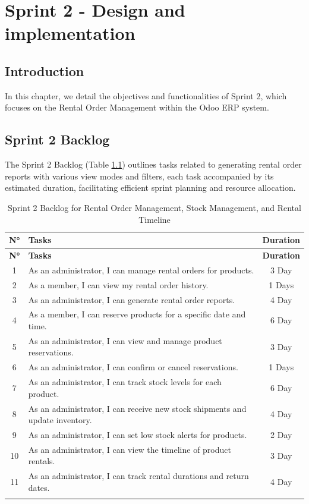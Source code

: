 \chapter{Sprint 2 - Design and implementation}

\section*{Introduction}
In this chapter, we detail the objectives and functionalities of Sprint 2, which focuses on the Rental Order Management within the Odoo ERP system.

\section{Sprint 2 Backlog}
The Sprint 2 Backlog (Table \ref{tab:sprint2_backlog}) outlines tasks related to generating rental order reports with various view modes and filters, each task accompanied by its estimated duration, facilitating efficient sprint planning and resource allocation.

\begin{longtable}{|c|p{8cm}|c|}
    \hline
    \rowcolor{purple!20} \textbf{N°} & \textbf{Tasks} & \textbf{Duration} \\ \hline
    \endfirsthead
    \hline
    \rowcolor{purple!20} \textbf{N°} & \textbf{Tasks} & \textbf{Duration} \\ \hline
    \endhead
    1 & As an administrator, I can manage rental orders for products. & 3 Day \\ \hline
    2 & As a member, I can view my rental order history. & 1 Days \\ \hline
    3 & As an administrator, I can generate rental order reports. & 4 Day \\ \hline
    4 & As a member, I can reserve products for a specific date and time. & 6 Day \\ \hline
    5 & As an administrator, I can view and manage product reservations. & 3 Day \\ \hline
    6 & As an administrator, I can confirm or cancel reservations. & 1 Days \\ \hline
    7 & As an administrator, I can track stock levels for each product. & 6 Day \\ \hline
    8 & As an administrator, I can receive new stock shipments and update inventory. & 4 Day \\ \hline
    9 & As an administrator, I can set low stock alerts for products. & 2 Day \\ \hline
    10 & As an administrator, I can view the timeline of product rentals. & 3 Day \\ \hline
    11 & As an administrator, I can track rental durations and return dates. & 4 Day \\ \hline
    \caption{Sprint 2 Backlog for Rental Order Management, Stock Management, and Rental Timeline}
    \label{tab:sprint2_backlog}
\end{longtable}

